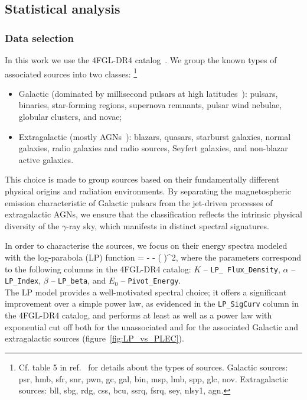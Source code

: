 \subsection{Statistical analysis}
\label{sec:approach}

\subsubsection{Data selection}
\label{sec:halos:data}


In this work we use the 4FGL-DR4 catalog~\cite{Fermi-LAT:2022byn, Ballet:2023qzs}. We group the known types of associated sources into two classes:%
\footnote{Cf. table 5 in ref.~\cite{Fermi-LAT:2022byn} for details about the types of sources. Galactic sources: psr, hmb, sfr, snr, pwn, gc, gal, bin, msp, lmb, spp, glc, nov. Extragalactic sources: bll, sbg, rdg, css, bcu, ssrq, fsrq, sey, nlsy1, agn.}
\begin{itemize}
    \item Galactic {(dominated by millisecond pulsars at high latitudes~\cite{smith2023third, Fermi-LAT:2019yla, DGRB-review, Hooper:2024, Cholis:2014noa, Caraveo:2013lra})}: pulsars, binaries, star-forming regions, supernova remnants, pulsar wind nebulae, globular clusters, and novae;
    \item Extragalactic ({mostly AGNs~\cite{fossati1998unifying, Fermi-LAT:2019yla, DGRB-review, Dermer:2009zz, Fermi-LAT:2014ryh, Ajello:2015mfa, Lisanti:2016jub}}): blazars, quasars, starburst galaxies, normal galaxies, radio galaxies and radio sources, Seyfert galaxies, and non-blazar active galaxies.
\end{itemize}
%
%
{This choice is made to group sources based on their fundamentally different physical origins and radiation environments. By separating the magnetospheric emission characteristic of Galactic pulsars from the jet-driven processes of extragalactic AGNs, we ensure that the classification reflects the intrinsic physical diversity of the $\gamma$-ray sky, which manifests in distinct spectral signatures.}

In order to characterise the sources, we focus on their energy spectra modeled with the log-parabola (LP) function
\be
\label{eq:log_par}
\ln {} = - \alpha \ln {} - \beta \left(\ln {} \right)^2,
\ee
where the parameters correspond to the following columns in the 4FGL-DR4 catalog:
$K$ -- {\tt LP\_ Flux\_Density},
$\alpha$ -- {\tt LP\_Index},
$\beta$ -- {\tt LP\_beta},
and $E_0$ -- {\tt Pivot\_Energy}.
%
\\
{The LP model provides a well-motivated spectral choice; it offers a significant improvement over a simple power law, as evidenced in the \texttt{LP\_SigCurv} column in the 4FGL-DR4 catalog, and performs at least as well as a power law with exponential cut off both for the unassociated and for the associated Galactic and extragalactic sources (figure~\ref{fig:LP_vs_PLEC}).} 


